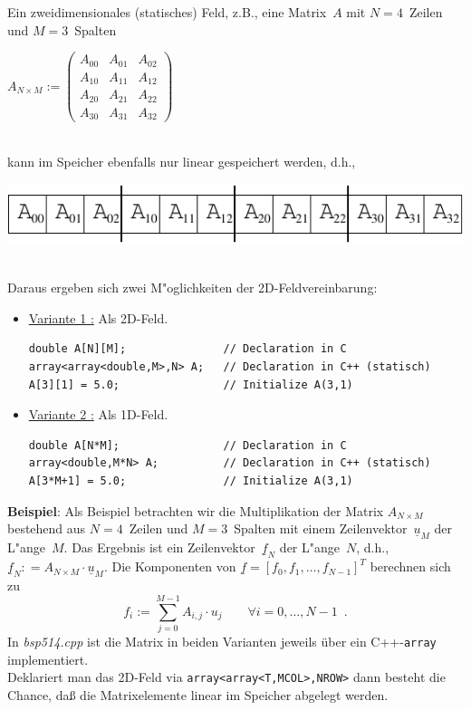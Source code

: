 Ein zweidimensionales (statisches) Feld, z.B., eine Matrix~$A$ mit $N=4$~Zeilen
und $M=3$~Spalten
\\[0.5ex]
\centerline{
$
A_{N \times M} :=
\begin{pmatrix}
 A_{00} & A_{01} & A_{02} \\
 A_{10} & A_{11} & A_{12} \\
 A_{20} & A_{21} & A_{22} \\
 A_{30} & A_{31} & A_{32}
\end{pmatrix}
$
}
\\[0.5ex]
kann im Speicher ebenfalls nur linear gespeichert werden, d.h.,
\\
\centerline{\includegraphics[scale=0.9]{kap512b.pdf}}
\\[0.5ex]
Daraus ergeben sich zwei M"oglichkeiten der 2D-Feldvereinbarung:
\begin{itemize}
 \item \underline{Variante 1 :} Als 2D-Feld.
%
\\[0.5ex]
\begin{minipage} {0.8\textwidth}
\begin{verbatim}
double A[N][M];               // Declaration in C
array<array<double,M>,N> A;   // Declaration in C++ (statisch)
A[3][1] = 5.0;                // Initialize A(3,1)
\end{verbatim}
\end{minipage}
%
 \item \underline{Variante 2 :} Als 1D-Feld.
 \label{page:2DarrayVariant2}
%
\\[0.5ex]
\begin{minipage} {0.8\textwidth}
\begin{verbatim}
double A[N*M];                // Declaration in C
array<double,M*N> A;          // Declaration in C++ (statisch)
A[3*M+1] = 5.0;               // Initialize A(3,1)
\end{verbatim}
\end{minipage}
%
\end{itemize}
%
\textbf{Beispiel}:  Als Beispiel betrachten wir die Multiplikation
der Matrix $A_{N \times M}$
bestehend aus $N=4$~Zeilen und $M=3$~Spalten
mit einem Zeilenvektor~$\underline{u}_M$
der L"ange~$M$.
Das Ergebnis ist ein Zeilenvektor~$\underline{f}_N$ der L"ange~$N$,
d.h., $\underline{f}_N : = A_{N \times M} \cdot \underline{u}_M$\enspace.
%
Die Komponenten von $\underline{f} = [f_0,f_1,\ldots,f_{N-1}]^T$
berechnen sich zu
\begin{displaymath}
 f_i := \sum_{j=0}^{M-1} A_{i,j} \cdot u_j
 \qquad \forall i=0,\ldots,N-1 \enspace.
\end{displaymath}
In \emph{bsp514.cpp} ist die Matrix in beiden Varianten
jeweils über ein C++-\texttt{array} implementiert.
\\
Deklariert man das 2D-Feld via \verb|array<array<T,MCOL>,NROW>| dann besteht
die Chance, daß die Matrixelemente linear im Speicher abgelegt werden.%
%

